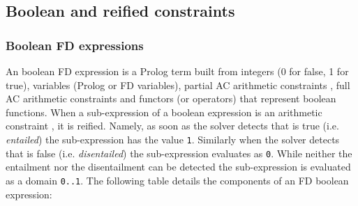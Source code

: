 \subsection{Boolean and reified constraints}
\label{Boolean-and-reified-constraints}

\subsubsection{Boolean FD expressions}
\label{Boolean-FD-expressions}
An boolean FD expression is a Prolog term built from integers (0 for false,
1 for true), variables (Prolog or FD variables), partial AC arithmetic
constraints , full AC arithmetic constraints
 and functors (or operators) that represent
boolean functions. When a sub-expression of a boolean expression is an
arithmetic constraint , it is reified. Namely, as soon as the
solver detects that  is true (i.e. \emph{entailed}) the
sub-expression has the value \texttt{1}. Similarly when the solver detects
that  is false (i.e. \emph{disentailed}) the sub-expression
evaluates as \texttt{0}. While neither the entailment nor the disentailment
can be detected the sub-expression is evaluated as a domain \texttt{0..1}.
The following table details the components of an FD boolean expression:

